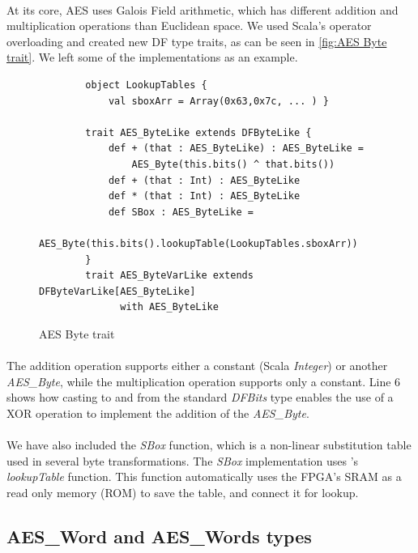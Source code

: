 \paragraph{}At its core, AES uses Galois Field arithmetic, which has different addition and multiplication operations than Euclidean space. We used Scala's operator overloading and created new DF type traits, as can be seen in \autoref{fig:AES Byte trait}. We left some of the implementations as an example.
\begin{figure}[h]
	\centering
	\begin{verbatim}
		object LookupTables {
			val sboxArr = Array(0x63,0x7c, ... ) }
			
		trait AES_ByteLike extends DFByteLike {
			def + (that : AES_ByteLike) : AES_ByteLike =
				AES_Byte(this.bits() ^ that.bits())
			def + (that : Int) : AES_ByteLike
			def * (that : Int) : AES_ByteLike
			def SBox : AES_ByteLike = 
				AES_Byte(this.bits().lookupTable(LookupTables.sboxArr))
		}
		trait AES_ByteVarLike extends DFByteVarLike[AES_ByteLike] 
		      with AES_ByteLike
	\end{verbatim}
	\caption{AES Byte trait}\label{fig:AES Byte trait}
\end{figure}
\paragraph{}The addition operation supports either a constant (Scala \textit{Integer}) or another \textit{AES\_Byte}, while the multiplication operation supports only a constant. Line 6 shows how casting to and from the standard \textit{DFBits} type enables the use of a XOR operation to implement the addition of the \textit{AES\_Byte}.
\paragraph{}We have also included the \textit{SBox} function, which is a non-linear substitution table used in several byte transformations. The \textit{SBox} implementation uses \cfns's \textit{lookupTable} function. This function automatically uses the FPGA's SRAM as a read only memory (ROM) to save the table, and connect it for lookup.

\subsection*{AES\_Word and AES\_Words types}
